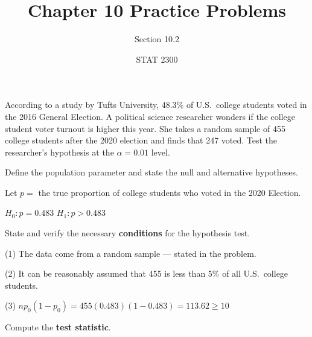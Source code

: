 \documentclass[noanswers]{exam}
\title{Chapter 10 Practice Problems}
\author{Section 10.2}
\date{STAT 2300}
\begin{document}
%

\noindent According to a study by Tufts University, 48.3\% of U.S.\ college students voted in the 2016 General Election. A political science researcher wonders if the college student voter turnout is higher this year. She takes a random sample of 455 college students after the 2020 election and finds that 247 voted. Test the researcher's hypothesis at the $\alpha=0.01$ level.

\begin{questions} 

\vspace{1mm}

\question Define the population parameter and state the null and alternative hypotheses.

\begin{solution}[\stretch{1}]

\vspace{1mm}

Let $p=$ the true proportion of college students who voted in the 2020 Election.

\vspace{3mm}

$H_0:p=0.483$
$H_1:p>0.483$

\vspace{1mm}

\end{solution}

\question State and verify the necessary \textbf{conditions} for the hypothesis test.

\begin{solution}[\stretch{1}]

\vspace{1mm}

(1) The data come from a random sample --- stated in the problem.

(2) It can be reasonably assumed that 455 is less than 5\% of all U.S.\ college students.

(3) $np_0(1-p_0)=455(0.483)(1-0.483)=113.62\geq 10$

\vspace{1mm}

\end{solution}

\question Compute the \textbf{test statistic}.


\end{questions}
\end{document}
